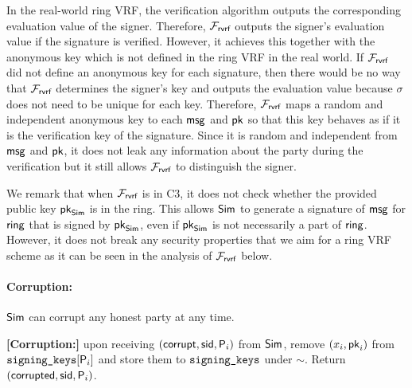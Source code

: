 	In the real-world ring VRF, the verification algorithm outputs the corresponding evaluation value of the signer. Therefore, $ \mathcal{F}_{\textsf{rvrf}} $  outputs the signer's evaluation value if the signature is verified. However, it achieves this together with the anonymous key which is not defined in the ring VRF in the real world.  If $ \mathcal{F}_{\textsf{rvrf}} $ did not define an anonymous key for  each signature, then there would be no way that $ \mathcal{F}_{\textsf{rvrf}} $ determines the signer's key and outputs the evaluation value because $ \sigma $ does not need to be unique for each key. Therefore, $ \mathcal{F}_{\textsf{rvrf}} $ maps a random and independent anonymous key to each $ \mathsf{msg} $ and $ \mathsf{pk} $ so that this key behaves as if it is the verification key of the signature. Since it  is  random and independent from $ \mathsf{msg} $ and $ \mathsf{pk} $, it does not leak any information about the party during the verification but it still allows $ \mathcal{F}_{\textsf{rvrf}} $ to distinguish the signer.
	
	We remark that when $ \mathcal{F}_{\textsf{rvrf}} $ is in C3, it does not check whether the provided public key $ \mathsf{pk}_{\mathsf{Sim}} $ is in the ring. This allows $\mathsf{Sim}$ to generate a signature of $\mathsf{msg}$ for $\mathsf{ring}$ that is signed by $\mathsf{pk}_{\mathsf{Sim}}$, even if $\mathsf{pk}_{\mathsf{Sim}}$ is not necessarily a part of $\mathsf{ring}$. However, it does not break any security properties that we aim for a ring VRF scheme as it can be seen in the analysis of $ \mathcal{F}_{\textsf{rvrf}} $ below.
	
	\paragraph{Corruption:} $ \mathsf{Sim} $ can corrupt any honest party at any time.  
	
	\begin{tcolorbox}[left=2pt,right=2pt]
		\eprint{}{\scriptsize}
		\textbf{[Corruption:] } 
		upon receiving $ (\mathsf{corrupt}, \textsf{sid}, \mathsf{P}_i) $ from $ \mathsf{Sim} $, remove $ (x_i,\mathsf{pk}_i) $ from $ \texttt{signing\_keys}[\mathsf{P}_i] $ and store them to $ \texttt{signing\_keys} $ under $ \sim $. Return $ (\mathsf{corrupted}, \textsf{sid},\mathsf{P}_i) $.
	\end{tcolorbox}
	
